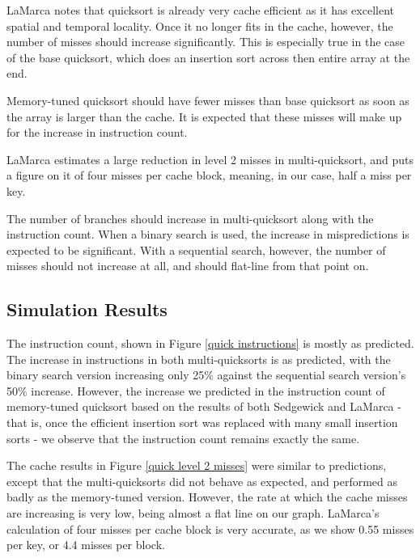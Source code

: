 LaMarca notes that quicksort is already very cache efficient as it has excellent
spatial and temporal locality. Once it no longer fits in the cache, however, the
number of misses should increase significantly. This is especially true in the
case of the base quicksort, which does an insertion sort across then entire
array at the end.

Memory-tuned quicksort should have fewer misses than base quicksort as soon as
the array is larger than the cache. It is expected that these misses will make
up for the increase in instruction count.

LaMarca estimates a large reduction in level 2 misses in multi-quicksort, and
puts a figure on it of four misses per cache block, meaning, in our case, half a
miss per key.

The number of branches should increase in multi-quicksort along with the
instruction count. When a binary search is used, the increase in mispredictions
is expected to be significant. With a sequential search, however, the number of
misses should not increase at all, and should flat-line from that point on.

\subsection{Simulation Results}


The instruction count, shown in Figure \ref{quick instructions} is mostly as
predicted. The increase in instructions in both multi-quicksorts is as
predicted, with the binary search version increasing only 25\% against the
sequential search version's 50\% increase. However, the increase we predicted in
the instruction count of memory-tuned quicksort based on the results of both Sedgewick
and LaMarca -  that is, once the efficient insertion sort was replaced with many
small insertion sorts - we observe that the instruction count remains exactly
the same.

The cache results in Figure \ref{quick level 2 misses} were similar to
predictions, except that the multi-quicksorts did not behave as expected, and
performed as badly as the memory-tuned version. However, the rate at which the
cache misses are increasing is very low, being almost a flat line on our graph.
LaMarca's calculation of four misses per cache block is very accurate, as we
show 0.55 misses per key, or 4.4 misses per block.

